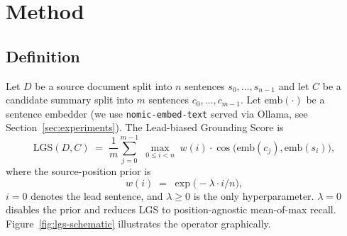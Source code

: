 \documentclass[journal]{IEEEtran}
\begin{document}
\section{Method}
\label{sec:method}

\subsection{Definition}
Let $D$ be a source document split into $n$ sentences
$s_0,\dots,s_{n-1}$ and let $C$ be a candidate summary split into
$m$ sentences $c_0,\dots,c_{m-1}$. Let $\mathrm{emb}(\cdot)$ be a
sentence embedder (we use \texttt{nomic-embed-text} served via
Ollama, see Section~\ref{sec:experiments}). The Lead-biased
Grounding Score is
\begin{equation}
\label{eq:lgs}
\mathrm{LGS}(D,C) \;=\; \frac{1}{m}\sum_{j=0}^{m-1}
\;\max_{0\le i<n}\; w(i)\cdot \cos\!\bigl(\mathrm{emb}(c_j),
\mathrm{emb}(s_i)\bigr),
\end{equation}
where the source-position prior is
\begin{equation}
\label{eq:wprior}
w(i) \;=\; \exp\!\bigl(-\lambda \cdot i / n\bigr),
\end{equation}
$i=0$ denotes the lead sentence, and $\lambda \ge 0$ is the only
hyperparameter. $\lambda=0$ disables the prior and reduces LGS to
position-agnostic mean-of-max recall.
Figure~\ref{fig:lgs-schematic} illustrates the operator
graphically.
\end{document}
